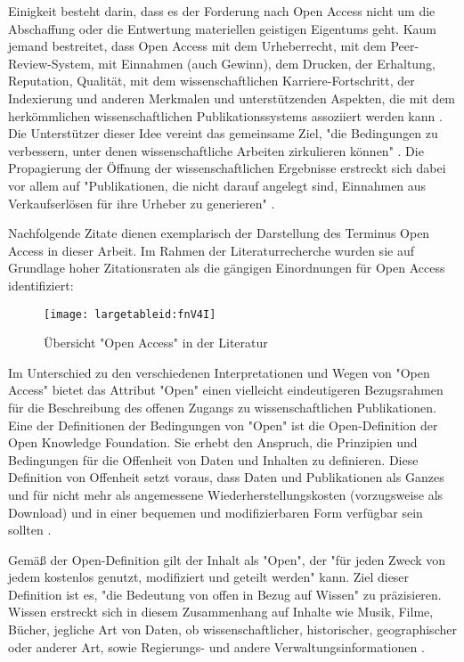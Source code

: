 Einigkeit besteht darin, dass es der Forderung nach Open Access nicht um die Abschaffung oder die Entwertung materiellen geistigen Eigentums geht. Kaum jemand bestreitet, dass Open Access mit dem Urheberrecht, mit dem Peer-Review-System, mit Einnahmen (auch Gewinn), dem Drucken, der Erhaltung, Reputation, Qualität, mit dem wissenschaftlichen Karriere-Fortschritt, der Indexierung und anderen Merkmalen und unterstützenden Aspekten, die mit dem herkömmlichen wissenschaftlichen Publikationssystems assoziiert werden kann \cite{Suber_2015}. Die Unterstützer dieser Idee vereint das gemeinsame Ziel, "die Bedingungen zu verbessern, unter denen wissenschaftliche Arbeiten zirkulieren können" \cite{Adema_2014}. Die Propagierung der Öffnung der wissenschaftlichen Ergebnisse erstreckt sich dabei vor allem auf "Publikationen, die nicht darauf angelegt sind, Einnahmen aus Verkaufserlösen für ihre Urheber zu generieren" \cite{Mueller_2010}.

Nachfolgende Zitate dienen exemplarisch der Darstellung des Terminus Open Access in dieser Arbeit. Im Rahmen der Literaturrecherche wurden sie auf Grundlage hoher Zitationsraten als die gängigen Einordnungen für Open Access identifiziert:
\begin{figure}[h!]
\texttt{[image: largetableid:fnV4I]}
\caption{Übersicht "Open Access" in der Literatur}
\end{figure}

Im Unterschied zu den verschiedenen Interpretationen und Wegen von "Open Access" bietet das Attribut "Open" einen vielleicht eindeutigeren Bezugsrahmen für die Beschreibung des offenen Zugangs zu wissenschaftlichen Publikationen. Eine der Definitionen der Bedingungen von "Open" ist die Open-Definition der Open Knowledge Foundation. Sie erhebt den Anspruch, die Prinzipien und Bedingungen für die Offenheit von Daten und Inhalten zu definieren. Diese Definition von Offenheit setzt voraus, dass Daten und Publikationen als Ganzes und für nicht mehr als angemessene Wiederherstellungskosten (vorzugsweise als Download) und in einer bequemen und modifizierbaren Form verfügbar sein sollten \cite{Molloy_2011}.

Gemäß der Open-Definition gilt der Inhalt als "Open", der "für jeden Zweck von jedem kostenlos genutzt, modifiziert und geteilt werden" \cite{Open_Definition_2014} kann. Ziel dieser Definition ist es, "die Bedeutung von offen in Bezug auf Wissen" zu präzisieren. Wissen erstreckt sich in diesem Zusammenhang auf Inhalte wie Musik, Filme, Bücher, jegliche Art von Daten, ob wissenschaftlicher, historischer, geographischer oder anderer Art, sowie Regierungs- und andere Verwaltungsinformationen \cite{Open_Definition_2014}.

